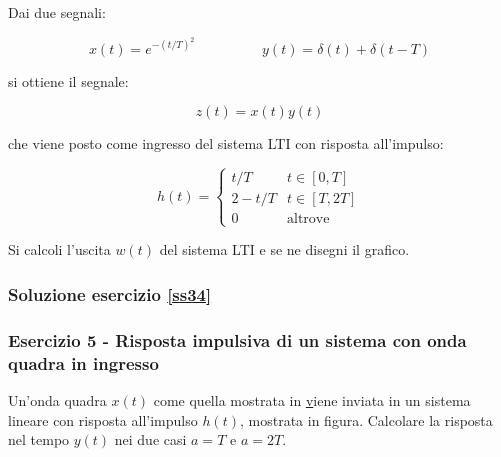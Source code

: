 \documentclass[../main.tex]{subfiles}
\begin{document}
Dai due segnali:

\begin{equation*}
	x(t) = e^{-(t/T)^2} \hspace{2cm} y(t) = \delta(t) + \delta(t-T)
\end{equation*}

si ottiene il segnale:

\begin{equation*}
	z(t) = x(t) y(t)
\end{equation*}

che viene posto come ingresso del sistema LTI con risposta all’impulso:

\begin{equation*}
h(t) = \begin{cases} 
      t/T &  t \in [0,T] \\
      2 - t/T  & t \in [T,2T]\\
      0 & \text{altrove} 
   \end{cases}
\end{equation*}

Si calcoli l’uscita $w(t)$ del sistema LTI e se ne disegni il grafico.

\subsubsection*{Soluzione esercizio \ref{ss34}}




\vspace*{1.5cm}
\subsubsection{Esercizio 5 - Risposta impulsiva di un sistema con onda quadra in ingresso}
\label{ss35}

Un’onda quadra $x(t)$ come quella mostrata in \href{figss35} viene inviata in un sistema lineare con risposta all’impulso $h(t)$, mostrata in figura. Calcolare la risposta nel tempo $y(t)$ nei due casi $a = T$ e $a = 2T$.
\end{document}
